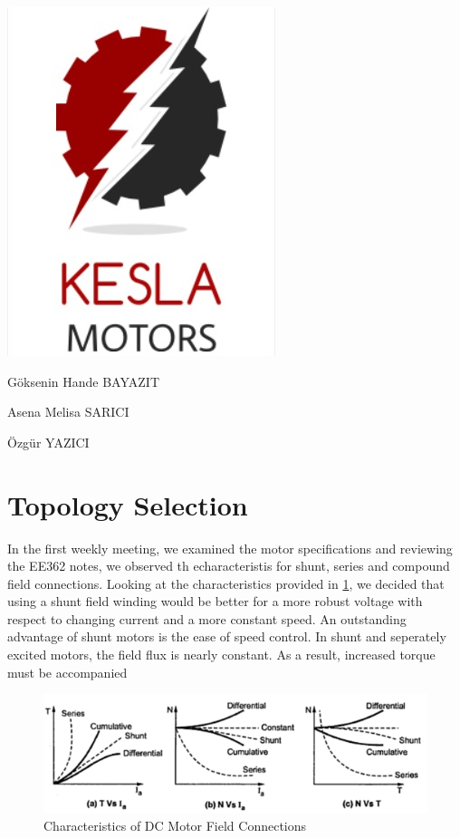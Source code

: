 \documentclass[10pt,a4paper]{article}
\begin{document}
\begin{titlepage}
\centering


\includegraphics[scale=0.8]{Logo.PNG} \par

\LARGE
\vspace{2cm}
{Göksenin Hande BAYAZIT\par Asena Melisa SARICI\par Özgür YAZICI}


\end{titlepage}

\newpage

\section*{Topology Selection}
In the first weekly meeting, we examined the motor specifications and reviewing the EE362 notes, we observed th echaracteristis for shunt, series and compound field connections. Looking at the characteristics provided in \ref{fig:1}, we decided that using a shunt field winding would be better for a more robust voltage with respect to changing current and a more constant speed.  An outstanding advantage of shunt motors is the ease of speed control.  In shunt and seperately excited motors, the field flux is nearly constant. As a result, increased torque must be accompanied 

\begin{figure}[!ht]
\includegraphics[scale=1]{char.jpeg} 
\caption{Characteristics of DC Motor Field Connections}
\label{fig:1}
\end{figure}
\end{document}
